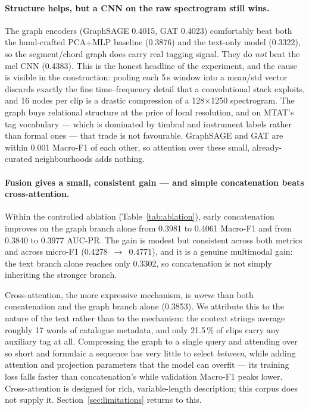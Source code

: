 \documentclass{article}
\begin{document}
\paragraph{Structure helps, but a CNN on the raw spectrogram still wins.} The
graph encoders (GraphSAGE 0.4015, GAT 0.4023) comfortably beat both the
hand-crafted PCA+MLP baseline (0.3876) and the text-only model (0.3322), so the
segment/chord graph does carry real tagging signal. They do \emph{not} beat the
mel CNN (0.4383). This is the honest headline of the experiment, and the cause
is visible in the construction: pooling each 5\,s window into a mean/std vector
discards exactly the fine time--frequency detail that a convolutional stack
exploits, and 16 nodes per clip is a drastic compression of a 128$\times$1250
spectrogram. The graph buys relational structure at the price of local
resolution, and on MTAT's tag vocabulary --- which is dominated by timbral and
instrument labels rather than formal ones --- that trade is not favourable.
GraphSAGE and GAT are within 0.001 Macro-F1 of each other, so attention over
these small, already-curated neighbourhoods adds nothing.

\paragraph{Fusion gives a small, consistent gain --- and simple concatenation
beats cross-attention.} Within the controlled ablation
(Table~\ref{tab:ablation}), early concatenation improves on the graph branch
alone from 0.3981 to 0.4061 Macro-F1 and from 0.3840 to 0.3977 AUC-PR. The gain
is modest but consistent across both metrics and across micro-F1
(0.4278~$\rightarrow$~0.4771), and it is a genuine multimodal gain: the text
branch alone reaches only 0.3302, so concatenation is not simply inheriting the
stronger branch.

Cross-attention, the more expressive mechanism, is \emph{worse} than both
concatenation and the graph branch alone (0.3853). We attribute this to the
nature of the text rather than to the mechanism: the context strings average
roughly 17 words of catalogue metadata, and only 21.5\,\% of clips carry any
auxiliary tag at all. Compressing the graph to a single query and attending over
so short and formulaic a sequence has very little to select \emph{between},
while adding attention and projection parameters that the model can overfit ---
its training loss falls faster than concatenation's while validation Macro-F1
peaks lower. Cross-attention is designed for rich, variable-length description;
this corpus does not supply it. Section~\ref{sec:limitations} returns to this.
\end{document}
